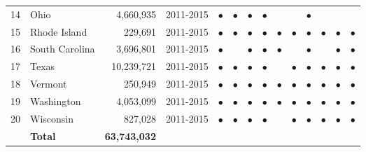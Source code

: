 \begin{table}[ht]
\begin{tabular}{llrccccccccccc}
  14 & Ohio &  4,660,935 & 2011-2015 & $\bullet$ & $\bullet$ & $\bullet$ & $\bullet$ &  &  & $\bullet$ &  &  &  \\ 
  15 & Rhode Island &    229,691 & 2011-2015 & $\bullet$ & $\bullet$ & $\bullet$ & $\bullet$ & $\bullet$ & $\bullet$ & $\bullet$ & $\bullet$ & $\bullet$ & $\bullet$ \\ 
  16 & South Carolina &  3,696,801 & 2011-2015 & $\bullet$ &  & $\bullet$ & $\bullet$ & $\bullet$ &  & $\bullet$ &  & $\bullet$ & $\bullet$ \\ 
  17 & Texas & 10,239,721 & 2011-2015 & $\bullet$ & $\bullet$ & $\bullet$ & $\bullet$ &  & $\bullet$ & $\bullet$ & $\bullet$ & $\bullet$ & $\bullet$ \\ 
  18 & Vermont &    250,949 & 2011-2015 & $\bullet$ & $\bullet$ & $\bullet$ & $\bullet$ & $\bullet$ & $\bullet$ & $\bullet$ & $\bullet$ & $\bullet$ & $\bullet$ \\ 
  19 & Washington &  4,053,099 & 2011-2015 & $\bullet$ & $\bullet$ & $\bullet$ & $\bullet$ & $\bullet$ & $\bullet$ & $\bullet$ & $\bullet$ & $\bullet$ & $\bullet$ \\ 
  20 & Wisconsin &    827,028 & 2011-2015 & $\bullet$ & $\bullet$ & $\bullet$ & $\bullet$ &  & $\bullet$ & $\bullet$ & $\bullet$ & $\bullet$ & $\bullet$ \\ 
   & \textbf{Total} & \textbf{63,743,032} &  &  &  &  &  &  &  &  &  &  &  \\ 
   \hline
\end{tabular}
\end{table}

